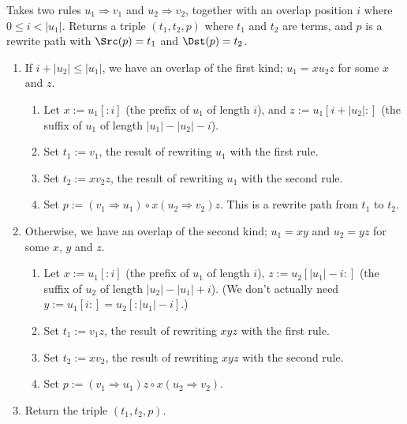 \documentclass[../generics]{subfiles}
\begin{document}
\begin{algorithm}\label{critical pair algo}
Takes two rules $u_1\Rightarrow v_1$ and $u_2\Rightarrow v_2$, together with an overlap position $i$ where $0\leq i<|u_1|$. Returns a triple $(t_1, t_2, p)$ where $t_1$ and $t_2$ are terms, and $p$ is a rewrite path with $\Src(p)=t_1$ and $\Dst(p)=t_2$.
\begin{enumerate}
\item If $i+|u_2|\leq|u_1|$, we have an overlap of the first kind; $u_1=xu_2z$ for some $x$ and $z$.
\begin{enumerate}
\item Let $x:=u_1[:i]$ (the prefix of $u_1$ of length $i$), and $z:=u_1[i+|u_2|:]$ (the suffix of $u_1$ of length $|u_1|-|u_2|-i$).
\item Set $t_1:=v_1$, the result of rewriting $u_1$ with the first rule.
\item Set $t_2:=xv_2z$, the result of rewriting $u_1$ with the second rule.
\item Set $p:=(v_1\Rightarrow u_1)\circ x(u_2\Rightarrow v_2)z$. This is a rewrite path from $t_1$ to $t_2$.
\end{enumerate}
\item Otherwise, we have an overlap of the second kind; $u_1=xy$ and $u_2=yz$ for some $x$, $y$ and $z$.
\begin{enumerate}
\item Let $x:=u_1[:i]$ (the prefix of $u_1$ of length $i$), $z:=u_2[|u_1|-i:]$ (the suffix of $u_2$ of length $|u_2|-|u_1|+i$). (We don't actually need $y:=u_1[i:]=u_2[:|u_1|-i]$.)
\item Set $t_1:=v_1z$, the result of rewriting $xyz$ with the first rule.
\item Set $t_2:=xv_2$, the result of rewriting $xyz$ with the second rule.
\item Set $p:=(v_1\Rightarrow u_1)z\circ x(u_2\Rightarrow v_2)$.
\end{enumerate}
\item Return the triple $(t_1, t_2, p)$.
\end{enumerate}
\end{algorithm}
\end{document}
